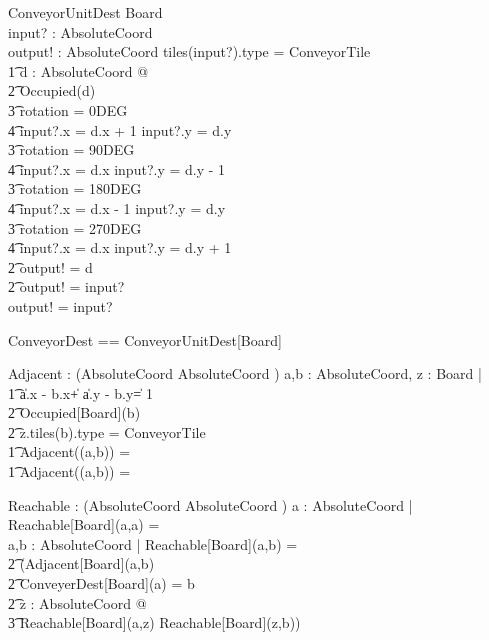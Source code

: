 \documentclass[12pt]{article}
\begin{document}
\begin{schema}{ConveyorUnitDest}
\Xi Board \\
input? : AbsoluteCoord \\
output! : AbsoluteCoord
\where
\IF tiles(input?).type = ConveyorTile \; \; \wedge \\ \t1
\exists d : AbsoluteCoord @ \\ \t2
\IF \neg Occupied(d) \; \; \wedge \\ \t3
rotation = 0DEG \Rightarrow \\ \t4 input?.x = d.x + 1 \wedge input?.y = d.y \\ \t3
rotation = 90DEG \Rightarrow \\ \t4 input?.x = d.x \wedge input?.y = d.y - 1
\\ \t3
rotation = 180DEG \Rightarrow \\ \t4 input?.x = d.x - 1 \wedge input?.y = d.y \\ \t3
rotation = 270DEG \Rightarrow \\ \t4 input?.x = d.x \wedge input?.y = d.y + 1 \\ \t2
\THEN output! = d \\ \t2
\ELSE output! = input? \\
\ELSE output! = input?
\end{schema}

\begin{gendef}[Board]
ConveyorDest == ConveyorUnitDest[Board] \star
\end{gendef}

\begin{gendef}[Board]
Adjacent : \power (AbsoluteCoord \times AbsoluteCoord \pfun \bool)
\where
\forall a,b : AbsoluteCoord, z : Board |\\ \t1
\IF \|a.x - b.x\| + \|a.y - b.y\| = 1 \\ \t2
\neg Occupied[Board](b) \\ \t2
z.tiles(b).type \not = ConveyorTile \\ \t1
\THEN Adjacent((a,b)) = \true \\ \t1
\ELSE Adjacent((a,b)) = \false
\end{gendef}

\begin{gendef}[Board]
Reachable : \power (AbsoluteCoord \times AbsoluteCoord \pfun \bool)
\where
\forall a : AbsoluteCoord | Reachable[Board](a,a) = \true \\
\forall a,b : AbsoluteCoord | Reachable[Board](a,b) = \\ \t2 (Adjacent[Board](a,b) \: \vee \\ \t2 ConveyerDest[Board](a) = b \: \vee \\ \t2
\exists z : AbsoluteCoord @ \\ \t3 Reachable[Board](a,z) \wedge Reachable[Board](z,b))
\end{gendef}
\end{document}
